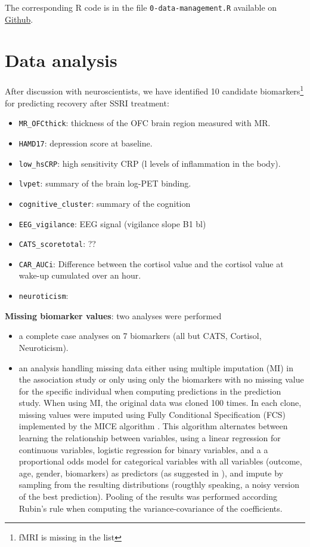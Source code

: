 \documentclass[12pt]{article}
\begin{document}
\bigskip

The corresponding R code is in the file \texttt{0-data-management.R} available on \href{https://github.com/bozenne/article-predictionNP1BD3/blob/master/code-data-analysis/0-data-management.R}{Github}.

\section{Data analysis}
\label{sec:orgfbb5365}

After discussion with neuroscientists, we have identified 10 candidate
biomarkers\footnote{fMRI is missing in the list} for predicting recovery after SSRI treatment:
\begin{itemize}
\item \texttt{MR\_OFCthick}: thickness of the OFC brain region measured with MR.
\item \texttt{HAMD17}: depression score at baseline.
\item \texttt{low\_hsCRP}: high sensitivity CRP (l levels of inflammation in the body).
\item \texttt{lvpet}: summary of the brain log-PET binding.
\item \texttt{cognitive\_cluster}: summary of the cognition
\item \texttt{EEG\_vigilance}: EEG signal (vigilance slope B1 bl)
\item \texttt{CATS\_scoretotal}: ??
\item \texttt{CAR\_AUCi}: Difference between the cortisol value and the cortisol value at wake-up cumulated over an hour.
\item \texttt{neuroticism}:
\end{itemize}

\bigskip

\textbf{Missing biomarker values}: two analyses were performed
\begin{itemize}
\item a complete case analyses on 7 biomarkers (all but CATS, Cortisol,
Neuroticism).
\item an analysis handling missing data either using multiple imputation
(MI) in the association study or only using only the biomarkers with
no missing value for the specific individual when computing
predictions in the prediction study. \newline When using MI, the
original data was cloned 100 times. In each clone, missing values
were imputed using Fully Conditional Specification (FCS) implemented
by the MICE algorithm \citep{van2011mice}. This algorithm alternates
between learning the relationship between variables, using a linear
regression for continuous variables, logistic regression for binary
variables, and a a proportional odds model for categorical variables
with all variables (outcome, age, gender, biomarkers) as predictors
(as suggested in \cite{moons2006using}), and impute by sampling from
the resulting distributions (rougthly speaking, a noisy version of
the best prediction). Pooling of the results was performed according
Rubin's rule when computing the variance-covariance of the
coefficients.
\end{itemize}
\end{document}

